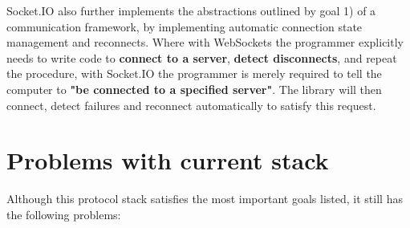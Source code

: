 \documentclass[conference]{IEEEtran}
\begin{document}
Socket.IO also further implements the abstractions outlined by goal 1) of a communication framework, by implementing automatic connection state management and reconnects. Where with WebSockets the programmer explicitly needs to write code to \textbf{connect to a server},  \textbf{detect disconnects}, and repeat the procedure, with Socket.IO the programmer is merely required to tell the computer to \textbf{"be connected to a specified server"}. The library will then connect, detect failures and reconnect automatically to satisfy this request. 


\section{Problems with current stack}

Although this protocol stack satisfies the most important goals listed, it still has the following problems:
\end{document}
